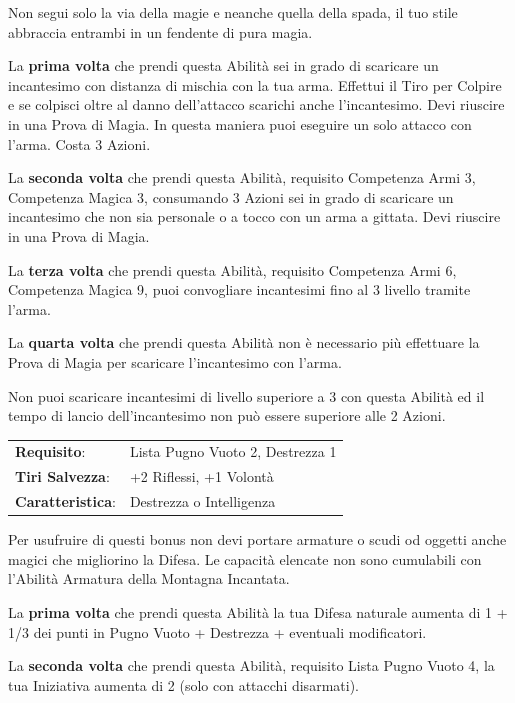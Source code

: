 \begin{multicols}{2}
Non segui solo la via della magie e neanche quella della spada, il tuo stile abbraccia entrambi in un fendente di pura magia.

La \textbf{prima volta} che prendi questa Abilità sei in grado di scaricare un incantesimo con distanza di mischia con la tua arma. Effettui il Tiro per Colpire e se colpisci oltre al danno dell'attacco scarichi anche l'incantesimo. Devi riuscire in una Prova di Magia. In questa maniera puoi eseguire un solo attacco con l'arma. Costa 3 Azioni.

La \textbf{seconda volta} che prendi questa Abilità, requisito Competenza Armi 3, Competenza Magica 3, consumando 3 Azioni sei in grado di scaricare un incantesimo che non sia personale o a tocco con un arma a gittata. Devi riuscire in una Prova di Magia.

La \textbf{terza volta} che prendi questa Abilità, requisito Competenza Armi 6, Competenza Magica 9, puoi convogliare incantesimi fino al 3 livello tramite l'arma.

La \textbf{quarta volta} che prendi questa Abilità non è necessario più effettuare la Prova di Magia per scaricare l'incantesimo con l'arma.

Non puoi scaricare incantesimi di livello superiore a 3 con questa Abilità ed il tempo di lancio dell'incantesimo non può essere superiore alle 2 Azioni.

\noindent\begin{tabularx}{\linewidth}{>{\raggedright\arraybackslash}p{2.5cm}X}
\rowcolor{gray!20}\textbf{Requisito}: & Lista Pugno Vuoto 2, Destrezza 1\\
\textbf{Tiri Salvezza}: & +2 Riflessi, +1 Volontà\\
\rowcolor{gray!20}\textbf{Caratteristica}: & Destrezza o Intelligenza\\
\end{tabularx}\smallskip

Per usufruire di questi bonus non devi portare armature o scudi od oggetti anche magici che migliorino la Difesa. Le capacità elencate non sono cumulabili con l'Abilità Armatura della Montagna Incantata.

La \textbf{prima volta} che prendi questa Abilità la tua Difesa naturale aumenta di 1 + 1/3 dei punti in Pugno Vuoto + Destrezza + eventuali modificatori.

La \textbf{seconda volta} che prendi questa Abilità, requisito Lista Pugno Vuoto 4, la tua Iniziativa aumenta di 2 (solo con attacchi disarmati).


\end{multicols}

